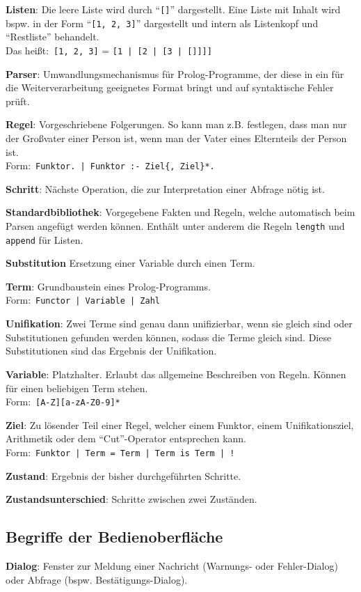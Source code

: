 \documentclass[parskip=full,11pt,twoside]{scrartcl}
\begin{document}
\textbf{Listen}:
Die leere Liste wird durch \enquote{\texttt{[]}} dargestellt. Eine Liste mit Inhalt wird bspw. in der Form \enquote{\texttt{[1, 2, 3]}} dargestellt und intern als Listenkopf und \enquote{Restliste} behandelt.\\Das heißt:\ \texttt{[1, 2, 3]} = \texttt{[1 | [2 | [3 | []]]]}

\textbf{Parser}:
Umwandlungsmechanismus für Prolog-Programme, der diese in ein für die Weiterverarbeitung geeignetes Format bringt und auf syntaktische Fehler prüft.

\textbf{Regel}:
Vorgeschriebene Folgerungen. So kann man z.B. festlegen, dass man nur der Großvater einer Person ist, wenn man der Vater eines Elternteils der Person ist.\\Form:\ \texttt{Funktor. | Funktor :- Ziel\{, Ziel\}*.}

\textbf{Schritt}:
Nächste Operation, die zur Interpretation einer Abfrage nötig ist.

\textbf{Standardbibliothek}:
Vorgegebene Fakten und Regeln, welche automatisch beim Parsen angefügt werden können. Enthält unter anderem die Regeln \texttt{length} und \texttt{append} für Listen.

\textbf{Substitution}
Ersetzung einer Variable durch einen Term.

\textbf{Term}:
Grundbaustein eines Prolog-Programms.\\Form:\  \texttt{Functor | Variable | Zahl}

\textbf{Unifikation}:
Zwei Terme sind genau dann unifizierbar, wenn sie gleich sind oder Substitutionen gefunden werden können, sodass die Terme gleich sind. Diese Substitutionen sind das Ergebnis der Unifikation.

\textbf{Variable}:
Platzhalter. Erlaubt das allgemeine Beschreiben von Regeln. Können für einen beliebigen Term stehen.\\Form:\  \texttt{[A-Z][a-zA-Z0-9]*}

\textbf{Ziel}:
Zu lösender Teil einer Regel, welcher einem Funktor, einem Unifikationsziel, Arithmetik oder dem \enquote{Cut}-Operator entsprechen kann.\\Form:\ \texttt{Funktor | Term = Term | Term is Term | !}

\textbf{Zustand}:
Ergebnis der bisher durchgeführten Schritte.

\textbf{Zustandsunterschied}:
Schritte zwischen zwei Zuständen.

\subsection{Begriffe der Bedienoberfläche}
\textbf{Dialog}:
Fenster zur Meldung einer Nachricht (Warnungs- oder Fehler-Dialog) oder Abfrage (bspw. Bestätigungs-Dialog).
\end{document}
